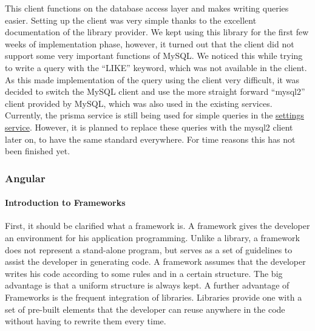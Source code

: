 \begin{itemize}
        This client functions on the database access layer and makes writing queries easier.
        Setting up the client was very simple thanks to the excellent documentation of the library provider.
        We kept using this library for the first few weeks of implementation phase, however, it turned out that the
        client did not support some very important functions of MySQL.
        We noticed this while trying to write a query with the \enquote{LIKE} keyword, which was not available in the
        client.
        As this made implementation of the query using the client very difficult, it was decided to switch the MySQL
        client and use the more straight forward \enquote{mysql2} client provided by MySQL, which was also used in the
        existing services.
        Currently, the prisma service is still being used for simple queries in the
        \hyperref[subsubsec:settingsSer]{settings service}.
        However, it is planned to replace these queries with the mysql2 client later on, to have the same standard
        everywhere.
        For time reasons this has not been finished yet.
\end{itemize}

\subsubsection{Angular}

\paragraph{Introduction to Frameworks}
First, it should be clarified what a framework is.
A framework gives the developer an environment for his application programming.
Unlike a library, a framework does not represent a stand-alone program, but serves as a set of guidelines to assist the
developer in generating code.
A framework assumes that the developer writes his code according to some rules and in a certain structure.
The big advantage is that a uniform structure is always kept.
A further advantage of Frameworks is the frequent integration of libraries.
Libraries provide one with a set of pre-built elements that the developer can reuse anywhere in the code without having
to rewrite them every time.

